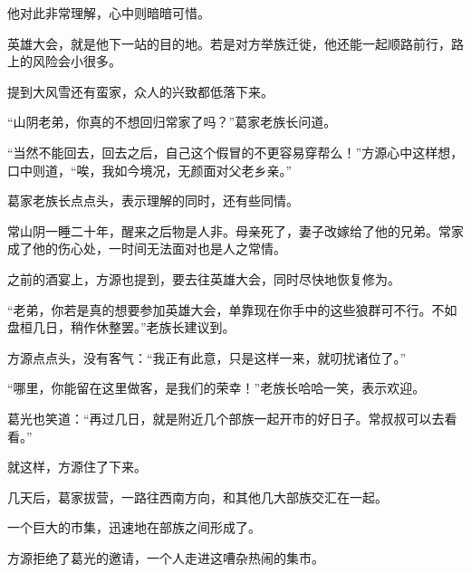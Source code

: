 \begin{this_body}
他对此非常理解，心中则暗暗可惜。

英雄大会，就是他下一站的目的地。若是对方举族迁徙，他还能一起顺路前行，路上的风险会小很多。

提到大风雪还有蛮家，众人的兴致都低落下来。

“山阴老弟，你真的不想回归常家了吗？”葛家老族长问道。

“当然不能回去，回去之后，自己这个假冒的不更容易穿帮么！”方源心中这样想，口中则道，“唉，我如今境况，无颜面对父老乡亲。”

葛家老族长点点头，表示理解的同时，还有些同情。

常山阴一睡二十年，醒来之后物是人非。母亲死了，妻子改嫁给了他的兄弟。常家成了他的伤心处，一时间无法面对也是人之常情。

之前的酒宴上，方源也提到，要去往英雄大会，同时尽快地恢复修为。

“老弟，你若是真的想要参加英雄大会，单靠现在你手中的这些狼群可不行。不如盘桓几日，稍作休整罢。”老族长建议到。

方源点点头，没有客气：“我正有此意，只是这样一来，就叨扰诸位了。”

“哪里，你能留在这里做客，是我们的荣幸！”老族长哈哈一笑，表示欢迎。

葛光也笑道：“再过几日，就是附近几个部族一起开市的好日子。常叔叔可以去看看。”

就这样，方源住了下来。

几天后，葛家拔营，一路往西南方向，和其他几大部族交汇在一起。

一个巨大的市集，迅速地在部族之间形成了。

方源拒绝了葛光的邀请，一个人走进这嘈杂热闹的集市。

\end{this_body}

